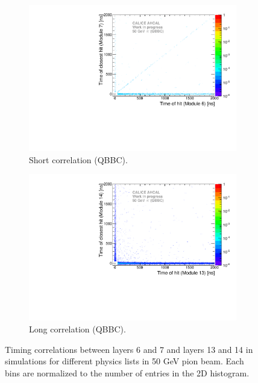\begin{figure}[htbp!]
\begin{subfigure}[t]{0.5\textwidth}
    \centering
    \includegraphics[width=1\textwidth]{../Thesis_Plots/Timing/Pions/Plots/ComparisonToSim/Time_Correlation_50GeV_short_QBBC.pdf}
    \caption{Short correlation (QBBC).} \label{fig:Corr_short_QBBC}
  \end{subfigure}
  \hfill
  \begin{subfigure}[t]{0.5\textwidth}
    \centering
    \includegraphics[width=1\textwidth]{../Thesis_Plots/Timing/Pions/Plots/ComparisonToSim/Time_Correlation_50GeV_long_QBBC.pdf}
    \caption{Long correlation (QBBC).} \label{fig:Corr_long_QBBC}
  \end{subfigure}
  \caption{Timing correlations between layers 6 and 7 and layers 13 and 14 in \mokka simulations for different physics lists in 50 GeV pion beam. Each bins are normalized to the number of entries in the 2D histogram.}
\end{figure}

